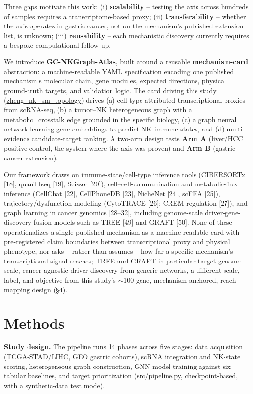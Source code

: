 \documentclass[modern,large,numbered,nocrop]{oup-authoring-template}
\begin{document}
Three gaps motivate this work: (i) \textbf{scalability} -- testing the axis across hundreds of samples requires a transcriptome-based proxy; (ii) \textbf{transferability} -- whether the axis operates in gastric cancer, not on the mechanism's published extension list, is unknown; (iii) \textbf{reusability} -- each mechanistic discovery currently requires a bespoke computational follow-up.

We introduce \textbf{GC-NKGraph-Atlas}, built around a reusable \textbf{mechanism-card} abstraction: a machine-readable YAML specification encoding one published mechanism's molecular chain, gene modules, expected directions, physical ground-truth targets, and validation logic. The card driving this study (\url{zheng_nk_sm_topology}) drives (a) cell-type-attributed transcriptional proxies from scRNA-seq, (b) a tumor--NK heterogeneous graph with a \url{metabolic_crosstalk} edge grounded in the specific biology, (c) a graph neural network learning gene embeddings to predict NK immune states, and (d) multi-evidence candidate-target ranking. A two-arm design tests \textbf{Arm A} (liver/HCC positive control, the system where the axis was proven) and \textbf{Arm B} (gastric-cancer extension).

Our framework draws on immune-state/cell-type inference tools (CIBERSORTx [18], quanTIseq [19], Scissor [20]), cell--cell-communication and metabolic-flux inference (CellChat [22], CellPhoneDB [23], NicheNet [24], scFEA [25]), trajectory/dysfunction modeling (CytoTRACE [26]; CREM regulation [27]), and graph learning in cancer genomics [28--32], including genome-scale driver-gene-discovery fusion models such as TREE [49] and GRAFT [50]. None of these operationalizes a single published mechanism as a machine-readable card with pre-registered claim boundaries between transcriptional proxy and physical phenotype, nor asks -- rather than assumes -- how far a specific mechanism's transcriptional signal reaches; TREE and GRAFT in particular target genome-scale, cancer-agnostic driver discovery from generic networks, a different scale, label, and objective from this study's $\sim$100-gene, mechanism-anchored, reach-mapping design (\S{}4).

\section{Methods}

\textbf{Study design.} The pipeline runs 14 phases across five stages: data acquisition (TCGA-STAD/LIHC, GEO gastric cohorts), scRNA integration and NK-state scoring, heterogeneous graph construction, GNN model training against six tabular baselines, and target prioritization (\url{src/pipeline.py}, checkpoint-based, with a synthetic-data test mode).
\end{document}
